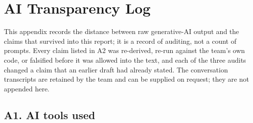 %

\ifdefined\reportbuild
  \newcommand{\reftext}[2]{#1}
\else
  \newcommand{\reftext}[2]{#2}
\fi

\section{AI Transparency Log}
\label{app:ai_log}

This appendix records the distance between raw generative-AI output and the
claims that survived into this report; it is a record of auditing, not a count
of prompts. Every claim listed in A2 was re-derived, re-run against the team's
own code, or falsified before it was allowed into the text, and each of the
three audits changed a claim that an earlier draft had already stated. The
conversation transcripts are retained by the team and can be supplied on
request; they are not appended here.

\subsection*{A1. AI tools used}

